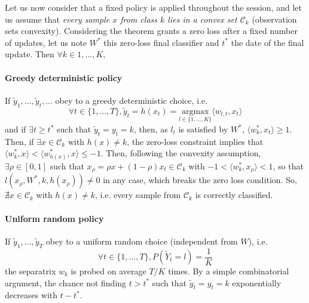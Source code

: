 \documentclass[preprint,12pt,authoryear]{elsarticle}
\begin{document}
Let us now consider  that a fixed policy is applied throughout the session, and let us assume that \emph{every sample $x$ from class $k$ lies in a convex set $\mathcal{C}_k$} (observation sets convexity). 
Considering the theorem grants a zero loss after a fixed number of updates, let us note  $W^*$ this zero-loss final classifier and $t^*$ the date of the final update. Then $\forall k \in 1,...,K$, 




	\paragraph{Greedy deterministic policy} If $\tilde{y}_1, ...,\tilde{y}_t, ...$ obey to a greedy deterministic choice, i.e. 
	$$\forall t \in \{1,...,T\}, \tilde{y}_t = h(x_t) = \underset{l \in \{1,...,K\}}{\text{argmax}} \langle w_{l,t}, x_t \rangle$$  
	and if $\exists t \geq t^*$ such that $\tilde{y}_t = y_t = k$, then, as $l_t$ is satisfied by $W^*$, $\langle w_k^*, x_t\rangle \geq 1$.  Then, if $\exists x \in \mathcal{C}_k$ with $h(x) \neq k$, the zero-loss constraint implies that  $\langle w_k^*, x\rangle < \langle w_{h(x)}^*, x\rangle \leq -1$. Then, following the convexity assumption, $\exists \rho \in [0,1]$ such that $x_\rho = \rho x + (1-\rho) x_t \in \mathcal{C}_k$ with 
	$-1 < \langle w_k^*,x_\rho \rangle < 1 $, so that $l(x_\rho,W^*,k,h(x_\rho))\neq 0$ in any case, which breaks the zero loss condition. So, $\nexists x \in \mathcal{C}_k$ with $h(x) \neq k$, i.e. every sample from $\mathcal{C}_k$ is correctly classified.
	\paragraph{Uniform random policy} If $\tilde{y}_1, ...,\tilde{y}_T$ obey to a uniform random choice (independent from $W$), i.e.
	$$\forall t \in \{1,...,T\}, P(\tilde{Y}_t=l) =  \frac{1}{K} $$
	 the separatrix $w_k$ is probed on average $T/K$ times. By a simple combinatorial argument, the chance not finding $t > t^*$ such that $\tilde{y}_t = y_t = k$ exponentially decreases with $t - t^*$.
\end{document}
